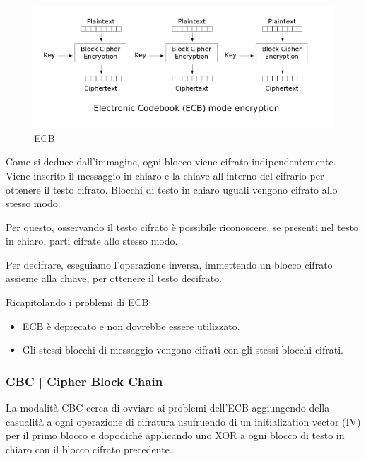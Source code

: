 
\begin{figure}[H]
	\centering
	\includegraphics[width=.9\textwidth, height=.9\textheight, keepaspectratio]{./images/aes_modes/ecb_encryption.png} %
	\caption{ECB}
	\label{fig:ecb}
\end{figure}

\textsf{\small Come si deduce dall'immagine, ogni blocco viene cifrato indipendentemente. Viene inserito il messaggio in chiaro e la chiave all'interno del cifrario per ottenere il testo cifrato. Blocchi di testo in chiaro uguali vengono cifrato allo stesso modo.}

\textsf{\small Per questo, osservando il testo cifrato è possibile riconoscere, se presenti nel testo in chiaro, parti cifrate allo stesso modo. }

\textsf{\small Per decifrare, eseguiamo l'operazione inversa, immettendo un blocco cifrato assieme alla chiave, per ottenere il testo decifrato.}

\textsf{\small Ricapitolando i problemi di ECB:}

\begin{itemize}
	\item \textsf{\small ECB è deprecato e non dovrebbe essere utilizzato.}
	\item \textsf{\small Gli stessi blocchi di messaggio vengono cifrati con gli stessi blocchi cifrati.}
\end{itemize}


\subsubsection{CBC | Cipher Block Chain}

\textsf{\small La modalità CBC cerca di ovviare ai problemi dell'ECB aggiungendo della casualità a ogni operazione di cifratura usufruendo di un initialization vector (IV) per il primo blocco e dopodiché applicando uno XOR a ogni blocco di testo in chiaro con il blocco cifrato precedente.} %

